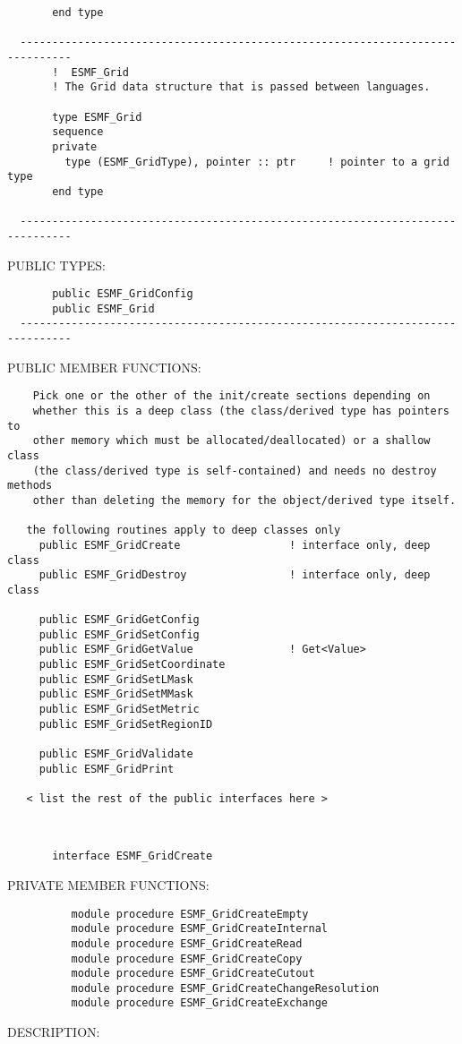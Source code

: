 {\begin{verbatim}
       end type
 
  ------------------------------------------------------------------------------
       !  ESMF_Grid
       ! The Grid data structure that is passed between languages.
 
       type ESMF_Grid
       sequence
       private
         type (ESMF_GridType), pointer :: ptr     ! pointer to a grid type
       end type
 
  ------------------------------------------------------------------------------\end{verbatim}{\sf PUBLIC TYPES:}
\begin{verbatim}       public ESMF_GridConfig
       public ESMF_Grid
  ------------------------------------------------------------------------------\end{verbatim}{\sf PUBLIC MEMBER FUNCTIONS:}
\begin{verbatim}    Pick one or the other of the init/create sections depending on
    whether this is a deep class (the class/derived type has pointers to
    other memory which must be allocated/deallocated) or a shallow class
    (the class/derived type is self-contained) and needs no destroy methods
    other than deleting the memory for the object/derived type itself.
 
   the following routines apply to deep classes only
     public ESMF_GridCreate                 ! interface only, deep class
     public ESMF_GridDestroy                ! interface only, deep class
 
     public ESMF_GridGetConfig
     public ESMF_GridSetConfig
     public ESMF_GridGetValue               ! Get<Value>
     public ESMF_GridSetCoordinate 
     public ESMF_GridSetLMask     
     public ESMF_GridSetMMask    
     public ESMF_GridSetMetric  
     public ESMF_GridSetRegionID
  
     public ESMF_GridValidate
     public ESMF_GridPrint
  
   < list the rest of the public interfaces here >\end{verbatim}
 
 
\mbox{}\hrulefill\ 
 

\begin{verbatim}       interface ESMF_GridCreate 
 \end{verbatim}{\sf PRIVATE MEMBER FUNCTIONS:}
\begin{verbatim}          module procedure ESMF_GridCreateEmpty
          module procedure ESMF_GridCreateInternal
          module procedure ESMF_GridCreateRead
          module procedure ESMF_GridCreateCopy
          module procedure ESMF_GridCreateCutout
          module procedure ESMF_GridCreateChangeResolution
          module procedure ESMF_GridCreateExchange
 \end{verbatim}
{\sf DESCRIPTION:\\ }


}
